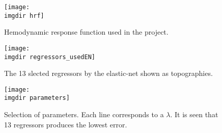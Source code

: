 \documentclass{article}
\newcommand{\imgdir}{Images/} %
\begin{document}
\begin{figure}[!ht]
    \centering
    \texttt{[image: \\imgdir hrf]}
    \caption{Hemodynamic response function used in the project.}
    \label{fig:hrf}
\end{figure}

\begin{figure}[!ht]
    \centering
    \texttt{[image: \\imgdir regressors\_usedEN]}
    \caption{The 13 slected regressors by the elastic-net shown as topographies.}
    \label{fig:regressors}
\end{figure}

\begin{figure}[!ht]
    \centering
    \texttt{[image: \\imgdir parameters]}
    \caption{Selection of parameters. Each line corresponds to a $\lambda$. It is seen that 13 regressors produces the lowest error.}
    \label{fig:parameters}
\end{figure}


\begin{table}[H]
\caption{Correlation.}
\label{table:Robustness}
\centering
{}
\end{table}

\begin{table}[H]
\caption{Robustness.}
\label{table:Robustness}
\centering
{}
\end{table}
\end{document}
